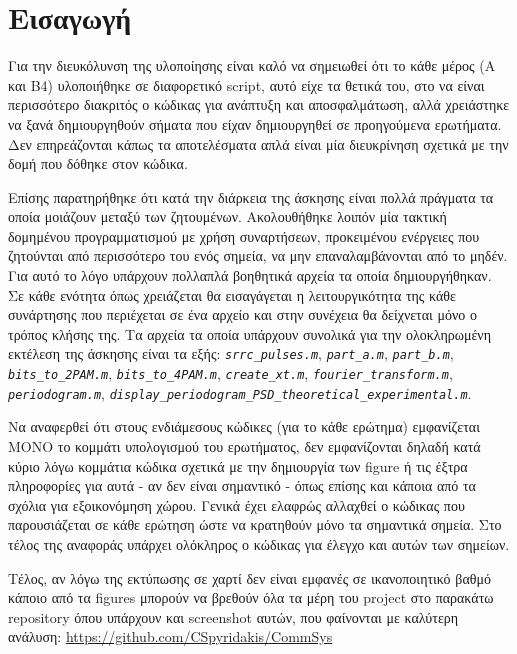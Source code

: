 \documentclass[11pt]{article}
\begin{document}
    \section*{Εισαγωγή}
    Για την διευκόλυνση της υλοποίησης είναι καλό να σημειωθεί ότι το κάθε μέρος (Α και Β4) υλοποιήθηκε σε διαφορετικό script, αυτό είχε τα θετικά του, στο να είναι περισσότερο διακριτός ο κώδικας για ανάπτυξη και αποσφαλμάτωση, αλλά χρειάστηκε να ξανά δημιουργηθούν σήματα που είχαν δημιουργηθεί σε προηγούμενα ερωτήματα. Δεν επηρεάζονται κάπως τα αποτελέσματα απλά είναι μία διευκρίνηση σχετικά με την δομή που δόθηκε στον κώδικα. 
    \par \noindent
    Επίσης παρατηρήθηκε ότι κατά την διάρκεια της άσκησης είναι πολλά πράγματα τα οποία μοιάζουν μεταξύ των ζητουμένων. Ακολουθήθηκε λοιπόν μία τακτική δομημένου προγραμματισμού με χρήση συναρτήσεων, προκειμένου ενέργειες που ζητούνται από περισσότερο του ενός σημεία, να μην επαναλαμβάνονται από το μηδέν. Για αυτό το λόγο υπάρχουν πολλαπλά βοηθητικά αρχεία τα οποία δημιουργήθηκαν. Σε κάθε ενότητα όπως χρειάζεται θα εισαγάγεται η λειτουργικότητα της κάθε συνάρτησης που περιέχεται σε ένα αρχείο και στην συνέχεια θα δείχνεται μόνο ο τρόπος κλήσης της. Τα αρχεία τα οποία υπάρχουν συνολικά για την ολοκληρωμένη εκτέλεση της άσκησης είναι τα εξής: \emph{\texttt{srrc\_pulses.m}}, \emph{\texttt{part\_a.m}}, \emph{\texttt{part\_b.m}}, \emph{\texttt{bits\_to\_2PAM.m}}, \emph{\texttt{bits\_to\_4PAM.m}}, \emph{\texttt{create\_xt.m}}, \emph{\texttt{fourier\_transform.m}}, \emph{\texttt{periodogram.m}}, \emph{\texttt{display\_periodogram\_PSD\_theoretical\_experimental.m}}.
    \par \noindent
    Να αναφερθεί ότι στους ενδιάμεσους κώδικες (για το κάθε ερώτημα) εμφανίζεται ΜΟΝΟ το κομμάτι υπολογισμού του ερωτήματος, δεν εμφανίζονται δηλαδή κατά κύριο λόγω κομμάτια κώδικα σχετικά με την δημιουργία των figure ή τις έξτρα πληροφορίες για αυτά - αν δεν είναι σημαντικό - όπως επίσης και κάποια από τα σχόλια για εξοικονόμηση χώρου. Γενικά έχει ελαφρώς αλλαχθεί ο κώδικας που παρουσιάζεται σε κάθε ερώτηση ώστε να κρατηθούν μόνο τα σημαντικά σημεία. Στο τέλος της αναφοράς υπάρχει ολόκληρος ο κώδικας για έλεγχο και αυτών των σημείων.
    \par \noindent
    Τέλος, αν λόγω της εκτύπωσης σε χαρτί δεν είναι εμφανές σε ικανοποιητικό βαθμό κάποιο από τα figures μπορούν να βρεθούν όλα τα μέρη του project στο παρακάτω repository όπου υπάρχουν και screenshot αυτών, που φαίνονται με καλύτερη ανάλυση: \url{https://github.com/CSpyridakis/CommSys}
\end{document}
